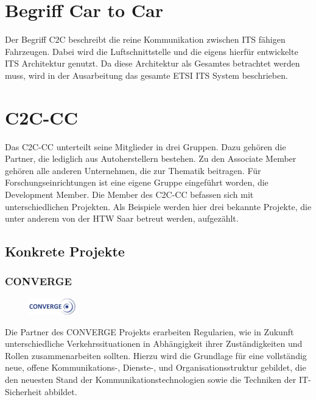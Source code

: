 \section{Begriff Car to Car}
Der Begriff \ac{C2C} beschreibt die reine Kommunikation zwischen \ac{ITS} fähigen Fahrzeugen. Dabei wird die Luftschnittstelle und die eigens hierfür entwickelte \ac{ITS} Architektur genutzt. Da diese Architektur als Gesamtes betrachtet werden muss, wird in der Ausarbeitung das gesamte \ac{ETSI} \ac{ITS} System beschrieben.  

\section{\acs{C2C-CC}}
Das \acl{C2C-CC} unterteilt seine Mitglieder in drei Gruppen. Dazu gehören die Partner, die lediglich aus Autoherstellern bestehen. Zu den Associate Member gehören alle anderen Unternehmen, die zur Thematik beitragen. Für Forschungseinrichtungen ist eine eigene Gruppe eingeführt worden, die Development Member. Die Member des \acl{C2C-CC} befassen sich mit unterschiedlichen Projekten. Als Beispiele werden hier drei bekannte Projekte, die unter anderem von der HTW Saar betreut werden, aufgezählt.
\subsection{Konkrete Projekte}
\subsubsection{\acs{CONVERGE}}
\begin{figure}
  \centering
  	 \includegraphics[width=0.18\textwidth]{./content/images/logos/logo-projekte/converge_logo.pdf}
\end{figure}
Die Partner des \ac{CONVERGE} Projekts erarbeiten Regularien, wie in Zukunft unterschiedliche Verkehrssituationen in Abhängigkeit ihrer Zuständigkeiten und Rollen zusammenarbeiten sollten. Hierzu wird die Grundlage für eine vollständig neue, 
offene Kommunikations-, Dienste-, und Organisationsstruktur gebildet, die den neuesten Stand der Kommunikationstechnologien sowie die Techniken der IT-Sicherheit abbildet. \cite{convergeBeschreibung}

